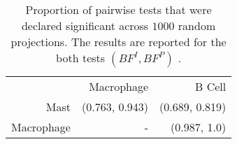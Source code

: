 \documentclass[12pt]{article}
\begin{document}
\begin{table}[ht]
\centering
\label{tab:table7a}
\caption{Proportion of pairwise tests that were declared significant across $1000$ random projections. The results are reported for the both tests $(BF^{I}, BF^{P})$ .}
\begin{tabular}{|rrr|}
  \hline
   & Macrophage & B Cell \\
    Mast & (0.763, 0.943)  & (0.689, 0.819) \\
    Macrophage & - & (0.987, 1.0)  \\
  \hline
\end{tabular}
\end{table}



\end{document}
